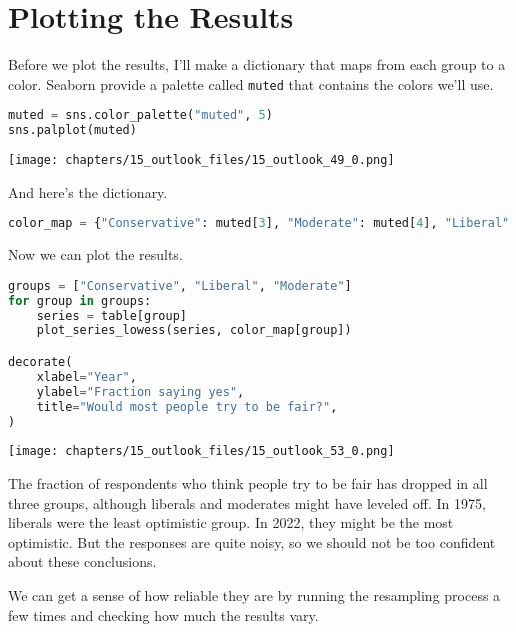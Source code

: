 \section{Plotting the Results}\label{plotting-the-results}

Before we plot the results, I'll make a dictionary that maps from each
group to a color. Seaborn provide a palette called
\passthrough{\lstinline!muted!} that contains the colors we'll use.

\begin{lstlisting}[language=Python,style=source]
muted = sns.color_palette("muted", 5)
sns.palplot(muted)
\end{lstlisting}

\begin{center}
\texttt{[image: chapters/15\_outlook\_files/15\_outlook\_49\_0.png]}
\end{center}

And here's the dictionary.

\begin{lstlisting}[language=Python,style=source]
color_map = {"Conservative": muted[3], "Moderate": muted[4], "Liberal": muted[0]}
\end{lstlisting}

Now we can plot the results.

\begin{lstlisting}[language=Python,style=source]
groups = ["Conservative", "Liberal", "Moderate"]
for group in groups:
    series = table[group]
    plot_series_lowess(series, color_map[group])

decorate(
    xlabel="Year",
    ylabel="Fraction saying yes",
    title="Would most people try to be fair?",
)
\end{lstlisting}

\begin{center}
\texttt{[image: chapters/15\_outlook\_files/15\_outlook\_53\_0.png]}
\end{center}

The fraction of respondents who think people try to be fair has dropped
in all three groups, although liberals and moderates might have leveled
off. In 1975, liberals were the least optimistic group. In 2022, they
might be the most optimistic. But the responses are quite noisy, so we
should not be too confident about these conclusions.

We can get a sense of how reliable they are by running the resampling
process a few times and checking how much the results vary.

